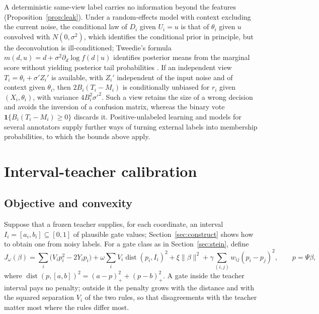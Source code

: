 \documentclass[11pt]{article}
\theoremstyle{plain}
\theoremstyle{definition}
\theoremstyle{remark}
\newcommand{\ind}{\mathbf 1}
\DeclareMathOperator{\dist}{dist}
\begin{document}
A deterministic same-view label carries no information beyond the features
(Proposition~\ref{prop:leak}). Under a random-effects model with context excluding the
current noise, the conditional law of $D_i$ given $U_i=u$ is that of $\theta_i$ given $u$
convolved with $N(0,\sigma^2)$, which identifies the conditional prior in principle, but the
deconvolution is ill-conditioned; Tweedie's formula $m(d,u)=d+\sigma^2\partial_d\log f(d\mid
u)$ identifies posterior means from the marginal score without yielding posterior tail
probabilities \citep{efron2011tweedie,brown2009nonparametric}. If an independent view
$T_i=\theta_i+\sigma' Z_i'$ is available, with $Z_i'$ independent of the input noise and
of context given $\theta_i$, then $2B_i(T_i-M_i)$ is conditionally unbiased for $r_i$ given
$(X_i,\theta_i)$, with variance $4B_i^2\sigma'^2$. Such a view retains the size of a wrong
decision and avoids the inversion of a confusion matrix, whereas the binary vote
$\ind\{B_i(T_i-M_i)\ge0\}$ discards it. Positive-unlabeled learning
\citep{elkan2008learning,kiryo2017positive,bekker2020learning} and models for several
annotators \citep{dawid1979maximum,raykar2010learning} supply further ways of turning
external labels into membership probabilities, to which the bounds above apply.

\section{Interval-teacher calibration}\label{sec:teacher}

\subsection{Objective and convexity}

Suppose that a frozen teacher supplies, for each coordinate, an interval
$I_i=[a_i,b_i]\subseteq[0,1]$ of plausible gate values; Section~\ref{sec:construct} shows
how to obtain one from noisy labels. For a gate class as in Section~\ref{sec:stein}, define
\begin{equation}\label{eq:objective}
J_\omega(\beta)=\sum_i\bigl(V_ip_i^2-2Y_ip_i\bigr)+\omega\sum_iV_i\dist(p_i,I_i)^2
+\xi\|\beta\|^2+\gamma\sum_{(i,j)}w_{ij}(p_i-p_j)^2,
\qquad p=\Psi\beta,
\end{equation}
where $\dist(p,[a,b])^2=(a-p)_+^2+(p-b)_+^2$. A gate inside the teacher interval pays no
penalty; outside it the penalty grows with the distance and with the squared separation
$V_i$ of the two rules, so that disagreements with the teacher matter most where the rules
differ most.
\end{document}
